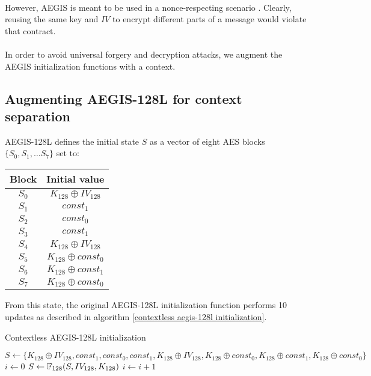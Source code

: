 \documentclass[envcountsame,runningheads,notitlepage]{llncs}
\begin{document}
\paragraph{}

However, AEGIS is meant to be used in a nonce-respecting scenario \cite{ACNS:VauViz18}. Clearly, reusing the same key and $IV$ to encrypt different parts of a message would violate that contract.

\paragraph{}

In order to avoid universal forgery and decryption attacks, we augment the AEGIS initialization functions with a context.

\subsection{Augmenting AEGIS-128L for context separation}
\label{sec:augmenting AEGIS-128L for context separation}

AEGIS-128L defines the initial state $S$ as a vector of eight AES blocks $\{S_0, S_1, \ldots S_7\}$ set to:

\begin{center}
  \begin{tabular}{|c|c|}
    \hline
    Block & Initial value             \\
    \hline
    $S_0$ & $K_{128} \oplus IV_{128}$ \\
    \hline
    $S_1$ & $const_1$                 \\
    \hline
    $S_2$ & $const_0$                 \\
    \hline
    $S_3$ & $const_1$                 \\
    \hline
    $S_4$ & $K_{128} \oplus IV_{128}$ \\
    \hline
    $S_5$ & $K_{128} \oplus const_0$  \\
    \hline
    $S_6$ & $K_{128} \oplus const_1$  \\
    \hline
    $S_7$ & $K_{128} \oplus const_0$  \\
    \hline
  \end{tabular}
\end{center}

From this state, the original AEGIS-128L initialization function performs 10 updates as described in algorithm \ref{contextless aegis-128l initialization}.

\begin{algorithm}
  \caption{Contextless AEGIS-128L initialization}
  \label{contextless aegis-128l initialization}
  \begin{algorithmic}
    \State $S \gets \{ K_{128} \oplus IV_{128}, const_1, const_0, const_1, K_{128} \oplus IV_{128}, K_{128} \oplus const_0, K_{128} \oplus const_1, K_{128} \oplus const_0 \}$
    \State $i \gets 0$
    \State $S \gets \mathbb{F}_{128}(S, IV_{128}, K_{128})$
    \State $i \gets i+1$
    \EndWhile
    \EndFunction
  \end{algorithmic}
\end{algorithm}
\end{document}

